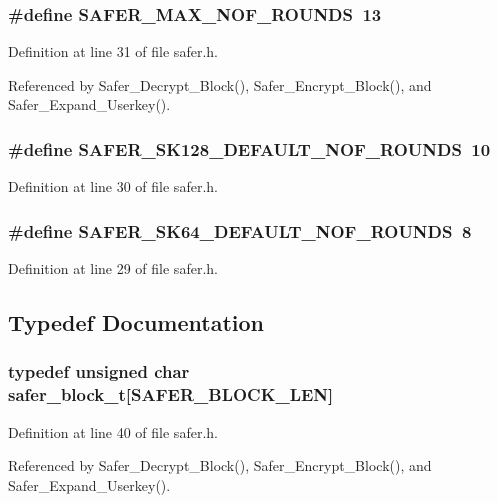 \subsubsection{\setlength{\rightskip}{0pt plus 5cm}\#define SAFER\_\-MAX\_\-NOF\_\-ROUNDS\ 13}\label{safer_8h_a4}




Definition at line 31 of file safer.h.

Referenced by Safer\_\-Decrypt\_\-Block(), Safer\_\-Encrypt\_\-Block(), and Safer\_\-Expand\_\-Userkey().
\subsubsection{\setlength{\rightskip}{0pt plus 5cm}\#define SAFER\_\-SK128\_\-DEFAULT\_\-NOF\_\-ROUNDS\ 10}\label{safer_8h_a3}




Definition at line 30 of file safer.h.
\subsubsection{\setlength{\rightskip}{0pt plus 5cm}\#define SAFER\_\-SK64\_\-DEFAULT\_\-NOF\_\-ROUNDS\ 8}\label{safer_8h_a2}




Definition at line 29 of file safer.h.

\subsection{Typedef Documentation}
\subsubsection{\setlength{\rightskip}{0pt plus 5cm}typedef unsigned char {\bf safer\_\-block\_\-t}[SAFER\_\-BLOCK\_\-LEN]}\label{safer_8h_a7}




Definition at line 40 of file safer.h.

Referenced by Safer\_\-Decrypt\_\-Block(), Safer\_\-Encrypt\_\-Block(), and Safer\_\-Expand\_\-Userkey().
